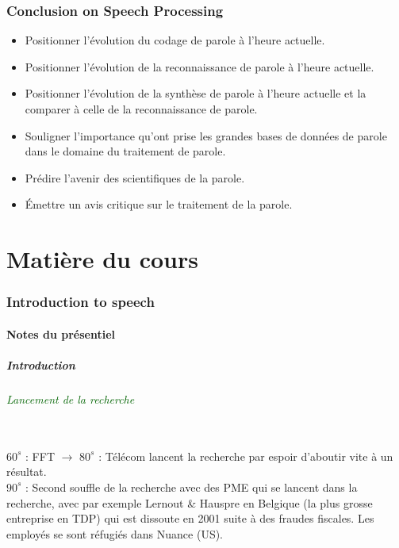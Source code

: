 \documentclass[letterpaper, 12pt]{article}
\newcommand{\green}[1]{
	\textcolor{darkgreen}{#1}
}
\begin{document}
\section{Conclusion on Speech Processing}
	\begin{itemize}
		\setlength{\itemsep}{0pt}		
		\setlength{\parskip}{0pt}		
		\setlength{\parsep}{0pt}	
	    \item Positionner l'évolution du codage de parole à l'heure actuelle.
	    \item Positionner l'évolution de la reconnaissance de parole à l'heure actuelle.
	    \item Positionner l'évolution de la synthèse de parole à l'heure actuelle et la comparer à celle 
	    	de la reconnaissance de parole.
	    \item Souligner l'importance qu'ont prise les grandes bases de données de parole dans le domaine du 
	    	traitement de parole.
	    \item Prédire l'avenir des scientifiques de la parole.
	    \item Émettre un avis critique sur le traitement de la parole.
	\end{itemize}
\pagebreak
%
%
%
%
%
%
%
%
%
%
%
%
%
%
%
%
%
%
\part{Matière du cours}
\section{Introduction to speech}
	\subsection{Notes du présentiel}
		\subsubsection{Introduction}
		\paragraph{\green{Lancement de la recherche}}~\\
			$60^s$ : FFT $\rightarrow$ $80^s$ : Télécom lancent la recherche par espoir d'aboutir vite 
			à un résultat.\\
			$90^s$ : Second souffle de la recherche avec des PME qui se lancent dans la recherche, avec 
			par exemple Lernout \& Hauspre en Belgique (la plus grosse entreprise en TDP) qui est dissoute 
			en 2001 suite à des fraudes fiscales. Les employés se sont réfugiés dans Nuance (US).\\
\end{document}
